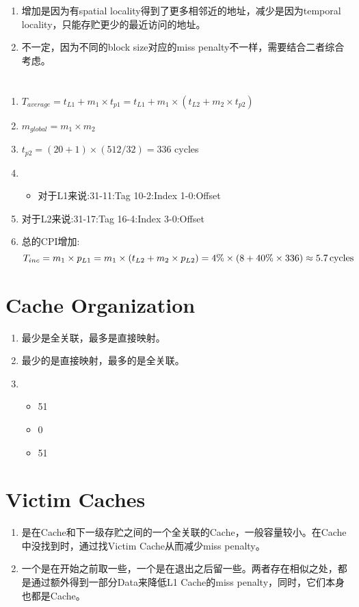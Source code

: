 \documentclass[a4paper,11pt]{article}
\begin{document}
\section{}
\begin{enumerate}
	\item 增加是因为有spatial locality得到了更多相邻近的地址，减少是因为temporal locality，只能存贮更少的最近访问的地址。
	\item 不一定，因为不同的block size对应的miss penalty不一样，需要结合二者综合考虑。
\end{enumerate}
\section{}
\begin{enumerate}
	\item $T_{average} = t_{L1} + m_1 \times t_{p1} = t_{L1} + m_1\times (t_{L2} + m_2\times t_{p2})$
	\item $m_{global} = m_1\times m_2$
	\item $t_{p2}=(20 + 1)\times (512 / 32) = 336$ cycles
	\item \begin{itemize}
		\item 对于L1来说:31-11:Tag 10-2:Index 1-0:Offset
	\end{itemize}
	\item 对于L2来说:31-17:Tag 16-4:Index 3-0:Offset
	\item 总的CPI增加:
	\[
		T_{inc} = m_1\times p_{L1} = m_1\times (t_{L2} + m_2\times p_{L2}) = 4\% \times (8 + 40\% \times 336) \approx 5.7\, \rm{cycles}
	\]
\end{enumerate}
\section{Cache Organization}
\begin{enumerate}
	\item 最少是全关联，最多是直接映射。
	\item 最少的是直接映射，最多的是全关联。
	\item \begin{itemize}
		\item 51
		\item 0
		\item 51
	\end{itemize}
\end{enumerate}
\section{Victim Caches}
\begin{enumerate}
	\item 是在Cache和下一级存贮之间的一个全关联的Cache，一般容量较小。在Cache中没找到时，通过找Victim Cache从而减少miss penalty。
	\item 一个是在开始之前取一些，一个是在退出之后留一些。两者存在相似之处，都是通过额外得到一部分Data来降低L1 Cache的miss penalty，同时，它们本身也都是Cache。
\end{enumerate}
\end{document}
